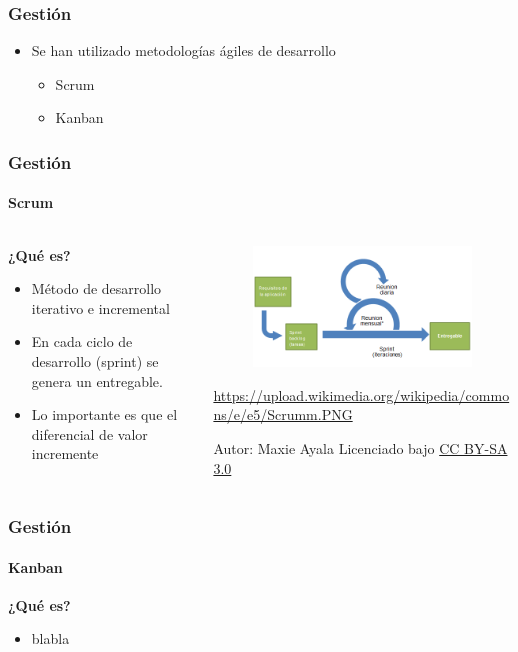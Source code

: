 \begin{frame}
	\frametitle{Gesti\'on}
	
	\begin{itemize}
		\item Se han utilizado metodolog\'ias \'agiles de desarrollo
		\begin{itemize}
			\item Scrum
			\item Kanban
		\end{itemize}
	\end{itemize}
	
\end{frame}

\begin{frame}
	\frametitle{Gesti\'on}
	\framesubtitle{Scrum}
	\begin{columns}[T] %
		
		\begin{column}[T]{0.5\linewidth} %
			\textbf{¿Qu\'e es?}
			\begin{itemize}
				\item M\'etodo de desarrollo iterativo e incremental
				\item En cada ciclo de desarrollo (sprint) se genera un 
				entregable.
				\item Lo importante es que el diferencial de valor incremente
			\end{itemize}
		\end{column}
		\begin{column}[T]{0.5\linewidth} %
			\begin{figure}
				\includegraphics[width=1.0\linewidth]{./Figures/Scrumm.PNG}
				\label{scrum}
			\end{figure}
			\tiny{\url{https://upload.wikimedia.org/wikipedia/commons/e/e5/Scrumm.PNG}
					
					Autor: Maxie Ayala 
					Licenciado bajo 
					\hyperlink{creativecommons.org/licenses/by-sa/3.0/}{CC 
					BY-SA 3.0}}
		\end{column}
	\end{columns}

\end{frame}

\begin{frame}
	\frametitle{Gesti\'on}
	\framesubtitle{Kanban}
	
	\textbf{¿Qu\'e es?}
	\begin{itemize}
		\item blabla
	\end{itemize}
	
\end{frame}